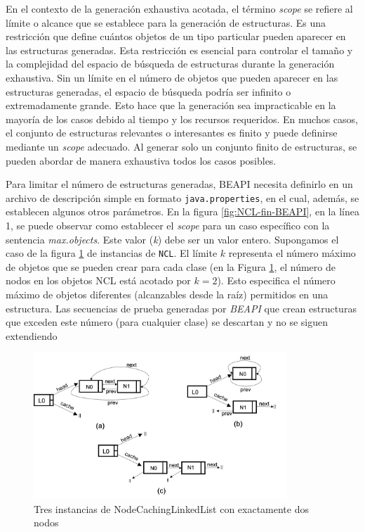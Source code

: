 En el contexto de la generación exhaustiva acotada, el término \emph{scope} se refiere al límite o alcance que se establece para la generación de estructuras. 
Es una restricción que define cuántos objetos de un tipo particular pueden aparecer en las estructuras generadas. 
Esta restricción es esencial para controlar el tamaño y la complejidad del espacio de búsqueda de estructuras durante 
la generación exhaustiva. Sin un límite en el número de objetos que pueden aparecer en las estructuras generadas,
 el espacio de búsqueda podría ser infinito o extremadamente grande. Esto hace que la generación sea impracticable en la mayoría de los casos debido al tiempo 
 y los recursos requeridos.  En muchos casos, el conjunto de estructuras relevantes o interesantes es finito y puede definirse mediante un \emph{scope} adecuado.
 Al generar solo un conjunto finito de estructuras, se pueden abordar de manera exhaustiva todos los casos posibles.

Para limitar el número de estructuras generadas, BEAPI necesita definirlo en un archivo de descripción simple en formato \texttt{java.properties}, 
en el cual, además, se establecen algunos otros parámetros. En la figura \ref{fig:NCL-fin-BEAPI}, en la línea 1, se puede observar como establecer 
el \emph{scope} para un caso específico con la sentencia \emph{max.objects}. Este valor (\emph{k}) debe ser un valor entero. Supongamos el caso de 
la figura \ref{fig:ncl-instances} de instancias de \texttt{NCL}.  El límite $k$ representa el número máximo de objetos que se pueden crear para cada 
clase (en la Figura \ref{fig:ncl-instances}, el número de nodos en los objetos NCL está acotado por $k=2$). Esto especifica el número máximo de objetos 
diferentes (alcanzables desde la raíz) permitidos en una estructura. Las secuencias de prueba generadas por \emph{BEAPI} que crean estructuras que 
exceden este número (para cualquier clase) se descartan y no se siguen extendiendo

\begin{figure}[H]
    \centering
    \includegraphics[width=0.85\textwidth]{images/NCL-instances.png}
    \caption{Tres instancias de NodeCachingLinkedList con exactamente dos nodos}
    \label{fig:ncl-instances}
\end{figure}

